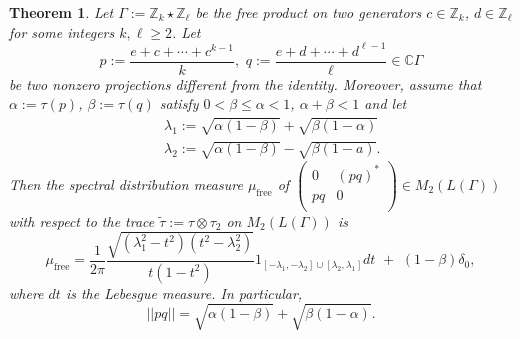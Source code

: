 \documentclass{amsart}
\newcommand{\C}{\mathbb C}
\newcommand{\Z}{\mathbb Z}
\newtheorem{thm}{Theorem}[section]
\theoremstyle{definition}
\begin{document}
\begin{thm}\label{t:freemeasure}
Let $\Gamma:=\Z_k\star \Z_\ell$ be the free product on two generators $c\in \Z_k$, $d\in\Z_\ell$ for some integers $k,\ell\ge 2$. Let
$$p:=\frac{e+c+\cdots+c^{k-1}}{k},\,\,q:=\frac{e+d+\cdots+d^{\ell-1}}{\ell}\in\C\Gamma$$ 
be two nonzero projections different from the identity.
Moreover, assume that  $\alpha:=\tau(p)$, $\beta :=\tau(q)$ satisfy $0< \beta \le \alpha <1$, $\alpha +\beta < 1$ and let
\begin{eqnarray*}
&&\lambda_1:=\sqrt{\alpha (1-\beta )}+\sqrt{\beta (1-\alpha )}\\
&&\lambda_2:=\sqrt{\alpha (1-\beta )}-\sqrt{\beta (1-a)}.
\end{eqnarray*}
Then the spectral distribution measure $\mu_{\mathrm{free}}$ of $\left(
\begin{array}{cc}
 0 & (pq)^* \\
 pq & 0 \\
\end{array}
\right)\in M_2(L(\Gamma))$  with respect to the trace $\tilde\tau:=\tau\otimes\tau_2$ on $M_2(L(\Gamma))$ is 
$$\mu_{\mathrm{free}}=\frac 1{2\pi}\frac{\sqrt{(\lambda_1^2-t^2)(t^2-\lambda_2^2)}}{t(1-t^2)} 1_{[-\lambda_1,-\lambda_2]\cup[\lambda_2,\lambda_1]} dt\,\,+\,\, (1-\beta )\delta_0,
$$
where $dt$ is the Lebesgue measure.
In particular,
$$||pq||=\sqrt{\alpha (1-\beta )}+\sqrt{\beta (1-\alpha )}.$$
\end{thm}
\end{document}
